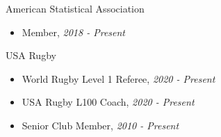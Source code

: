 
\Affiliation
{American Statistical Association}
{\begin{itemize}
    \item Member, \emph{2018 - Present}
\end{itemize}}

\vspace*{0.01 in}

\Affiliation
{USA Rugby}
{\begin{itemize}
    \item World Rugby Level 1 Referee, \emph{2020 - Present}
    \item USA Rugby L100 Coach, \emph{2020 - Present}
    \item Senior Club Member, \emph{2010 - Present}
\end{itemize}}